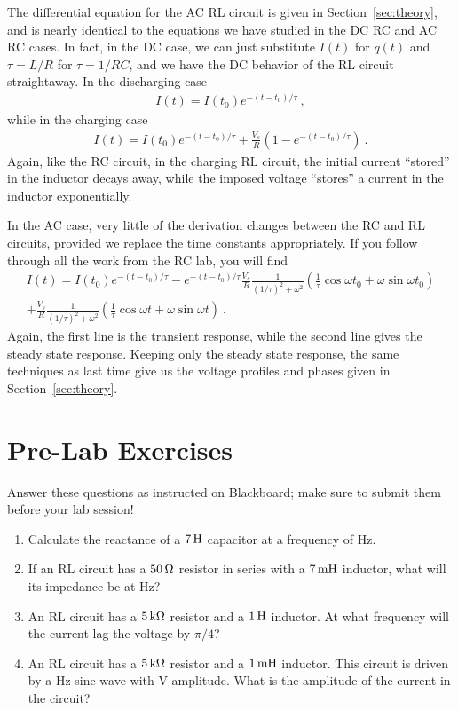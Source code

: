 \documentclass[12pt]{article}
\begin{document}
The differential equation for the AC RL circuit is given in
Section~\ref{sec:theory}, and is nearly identical to the equations we
have studied in the DC RC and AC RC cases.  In fact, in the DC case,
we can just substitute $I(t)$ for $q(t)$ and $\tau = L/R$ for $\tau =
1/RC$, and we have the DC behavior of the RL circuit straightaway.  In
the discharging case
\begin{gather*}
  I(t) = I(t_0) e^{-(t-t_0)/\tau}\ ,
\end{gather*}
while in the charging case
\begin{gather*}
  I(t) = I(t_0) e^{-(t-t_0)/\tau} 
  + \frac{V_s}{R} \left(1-e^{-(t-t_0)/\tau} \right)\ .
\end{gather*}
Again, like the RC circuit, in the charging RL circuit, the initial
current ``stored'' in the inductor decays away, while the imposed
voltage ``stores'' a current in the inductor exponentially.

In the AC case, very little of the derivation changes between the RC
and RL circuits, provided we replace the time constants
appropriately.  If you follow through all the work from the RC lab,
you will find
\begin{multline*}
  I(t) = I(t_0) e^{-(t-t_0)/\tau} 
  - e^{-(t-t_0)/\tau} \frac{V_s}{R} \frac{1}{(1/\tau)^2 + \omega^2} 
  \left( \frac{1}{\tau} \cos \omega t_0 + \omega \sin \omega t_0 \right) \\
  + \frac{V_s}{R} \frac{1}{(1/\tau)^2 + \omega^2} 
  \left( \frac{1}{\tau} \cos \omega t + \omega \sin \omega t \right)\ .
\end{multline*}
Again, the first line is the transient response, while the second line
gives the steady state response.  Keeping only the steady state
response, the same techniques as last time give us the voltage
profiles and phases given in Section~\ref{sec:theory}.

\newpage

\section*{Pre-Lab Exercises}

Answer these questions as instructed on Blackboard; make sure to
submit them before your lab session!

\begin{enumerate}
\item Calculate the reactance of a $\unit[7]{H}$ capacitor at a
  frequency of \unit[250]{Hz}.
\item If an RL circuit has a $\unit[50]{\Omega}$ resistor in series
  with a $\unit[7]{m H}$ inductor, what will its impedance be at
  \unit[500]{Hz}?
\item An RL circuit has a $\unit[5]{k\Omega}$ resistor and a
  $\unit[1]{H}$ inductor.  At what frequency will the current
  lag the voltage by $\pi/4$?
\item An RL circuit has a $\unit[5]{k\Omega}$ resistor and a
  $\unit[1]{m H}$ inductor.  This circuit is driven by a
  \unit[100]{Hz} sine wave with \unit[1]{V} amplitude.  What is the
  amplitude of the current in the circuit?
\end{enumerate}
\end{document}
